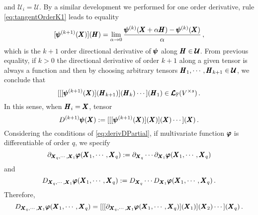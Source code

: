 and $\pmb{\mathcal{U}}_i=\pmb{\mathcal{U}}$. By a similar development we performed for one order derivative, rule \eqref{eq:tangentOrderK1} leads to equality
\begin{equation}\label{eq:directDerivK1}
[\pmb{\psi}^{(k+1)}(\pmb{X})](\pmb{H})=\lim_{\alpha\to 0} \dfrac{\pmb{\psi}^{(k)}(\pmb{X}+\alpha\pmb{H})-\pmb{\psi}^{(k)}(\pmb{X})}{\alpha}\,,
\end{equation}
which is the $k+1$ order directional derivative of $\pmb{\psi}$ along $\pmb{H}\in\pmb{\mathcal{U}}$. From previous equality, if $k>0$ the directional derivative of order $k+1$ along a given tensor is always a function and then by choosing arbitrary tensors $\pmb{H}_1,\cdots,\pmb{H}_{k+1}\in\pmb{\mathcal{U}}$, we conclude that
\begin{equation}\label{eq:toOrderZero}
[[[\pmb{\psi}^{(k+1)}(\pmb{X})](\pmb{H}_{k+1})](\pmb{H}_k)\cdots](\pmb{H}_{1})\in\pmb{\mathcal{L}}_{\mathbb{F}}(V^{\times s})\,.
\end{equation}
In this sense, when $\pmb{H}_i=\pmb{X}$, tensor 
\begin{equation}
D^{(k+1)}\pmb{\psi}(\pmb{X}):=[[[\pmb{\psi}^{(k+1)}(\pmb{X})](\pmb{X})](\pmb{X})\cdots](\pmb{X})\,.
\end{equation}
Considering the conditions of \eqref{eq:derivDPartial}, if multivariate function $\pmb{\varphi}$ is differentiable of order $q$, we specify
\begin{equation}
\partial_{\pmb{X}_q,\cdots,\pmb{X}_1}\pmb{\varphi}(\pmb{X}_1,\cdots,\pmb{X}_q):=\partial_{\pmb{X}_q}\cdots\partial_{\pmb{X}_1}\pmb{\varphi}(\pmb{X}_1,\cdots,\pmb{X}_q)
\end{equation}
and 
\begin{equation}
D_{\pmb{X}_q,\cdots,\pmb{X}_1}\pmb{\varphi}(\pmb{X}_1,\cdots,\pmb{X}_q):=D_{\pmb{X}_q}\cdots D_{\pmb{X}_1}\pmb{\varphi}(\pmb{X}_1,\cdots,\pmb{X}_q)\,.
\end{equation}
Therefore,
\begin{equation}
D_{\pmb{X}_q,\cdots,\pmb{X}_1}\pmb{\varphi}(\pmb{X}_1,\cdots,\pmb{X}_q)=[[[\partial_{\pmb{X}_q,\cdots,\pmb{X}_1}\pmb{\varphi}(\pmb{X}_1,\cdots,\pmb{X}_q)](\pmb{X}_1)](\pmb{X}_{2})\cdots](\pmb{X}_q)\,.
\end{equation}

